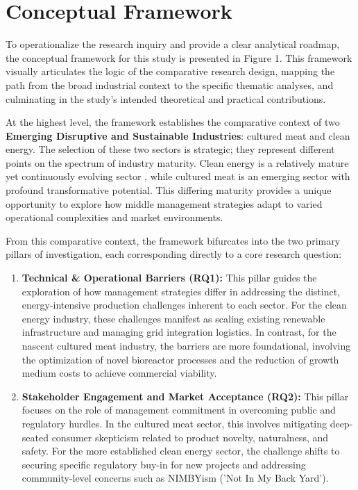 \section*{Conceptual Framework}

To operationalize the research inquiry and provide a clear analytical roadmap, the conceptual framework for this study is presented in Figure 1. This framework visually articulates the logic of the comparative research design, mapping the path from the broad industrial context to the specific thematic analyses, and culminating in the study's intended theoretical and practical contributions.

At the highest level, the framework establishes the comparative context of two \textbf{Emerging Disruptive and Sustainable Industries}: cultured meat and clean energy. The selection of these two sectors is strategic; they represent different points on the spectrum of industry maturity. Clean energy is a relatively mature yet continuously evolving sector , while cultured meat is an emerging sector with profound transformative potential. This differing maturity provides a unique opportunity to explore how middle management strategies adapt to varied operational complexities and market environments.

From this comparative context, the framework bifurcates into the two primary pillars of investigation, each corresponding directly to a core research question:

\begin{enumerate}
	\item \textbf{Technical \& Operational Barriers (RQ1):} This pillar guides the exploration of how management strategies differ in addressing the distinct, energy-intensive production challenges inherent to each sector. For the clean energy industry, these challenges manifest as scaling existing renewable infrastructure and managing grid integration logistics. In contrast, for the nascent cultured meat industry, the barriers are more foundational, involving the optimization of novel bioreactor processes and the reduction of growth medium costs to achieve commercial viability.
	
	\item \textbf{Stakeholder Engagement and Market Acceptance (RQ2):} This pillar focuses on the role of management commitment in overcoming public and regulatory hurdles. In the cultured meat sector, this involves mitigating deep-seated consumer skepticism related to product novelty, naturalness, and safety. For the more established clean energy sector, the challenge shifts to securing specific regulatory buy-in for new projects and addressing community-level concerns such as NIMBYism ('Not In My Back Yard').
\end{enumerate}

